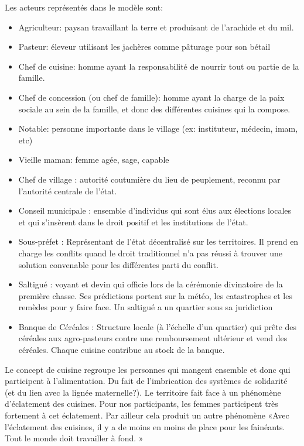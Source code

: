 Les acteurs représentés dans le modèle sont:
\begin{itemize}
  \item Agriculteur: paysan travaillant la terre et produisant de l'arachide et du mil.
  \item Pasteur: éleveur utilisant les jachères comme pâturage pour son bétail
  \item Chef de cuisine: homme ayant la responsabilité de nourrir tout ou partie de la famille.
  \item Chef de concession (ou chef de famille): homme ayant la charge de la paix sociale au sein de la famille, et donc des différentes cuisines qui la compose.
  \item Notable: personne importante dans le village (ex: instituteur, médecin, imam, etc)
  \item Vieille maman:  femme agée, sage, capable
  \item Chef de village : autorité coutumière du lieu de peuplement, reconnu par l'autorité centrale de l'état.
  \item Conseil municipale : ensemble d'individus qui sont élus aux élections locales et qui s'insèrent dans le droit positif et les institutions de l'état.
  \item Sous-préfet : Représentant de l'état décentralisé sur les territoires. Il prend en charge les conflits quand le droit traditionnel n'a pas réussi à trouver une solution convenable pour les différentes parti du conflit.
  \item Saltigué : voyant et devin qui officie lors de la cérémonie divinatoire de la première chasse. Ses prédictions portent sur la météo, les catastrophes et les remèdes pour y faire face. Un saltigué a un quartier sous sa juridiction
  \item Banque de Céréales : Structure locale (à l'échelle d'un quartier) qui prête des céréales aux agro-pasteurs contre une remboursement ultérieur et vend des céréales. Chaque cuisine contribue au stock de la banque.
\end{itemize}

Le concept de cuisine regroupe les personnes qui mangent ensemble et donc qui participent à l’alimentation. Du fait de l’imbrication des systèmes de solidarité (et du lien avec la lignée maternelle?). Le territoire fait face à un phénomène d’éclatement des cuisines.  Pour nos participants, les femmes participent très fortement à cet éclatement. Par ailleur cela produit un autre phénomène «Avec l’éclatement des cuisines, il y a de moins en moins de place pour les fainéants. Tout le monde doit travailler à fond. »


